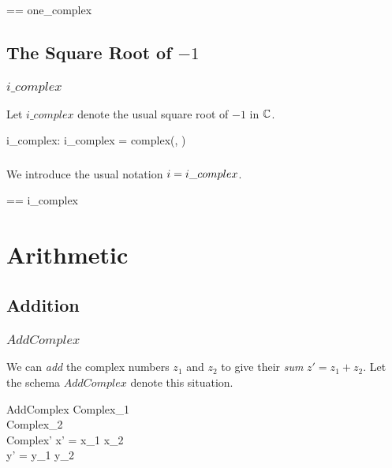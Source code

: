 \documentclass[11pt, oneside]{article}
\begin{document}
\begin{zed}
	\oneC == one\_complex
\end{zed}

\subsection{The Square Root of $-1$}

\subsubsection{$i\_complex$}

Let $i\_complex$ denote the usual square root of $-1$ in $\mathbb{C}$.

\begin{axdef}
	i\_complex: \C
\where
	i\_complex = complex(\zeroR, \oneR)
\end{axdef}

\subsubsection{}

We introduce the usual notation $i = i\_complex$.

\begin{zed}
	\iC == i\_complex
\end{zed}

\section{Arithmetic}

\subsection{Addition}

\subsubsection{$AddComplex$}

We can \textit{add} the complex numbers $z_1$ and $z_2$ to give their \textit{sum} $z' = z_1 + z_2$.
Let the schema $AddComplex$ denote this situation.

\begin{schema}{AddComplex}
	Complex_1 \\
	Complex_2 \\
	Complex'
\where
	x' = x_1 \addR x_2 \\
	y' = y_1 \addR y_2
\end{schema}
\end{document}
